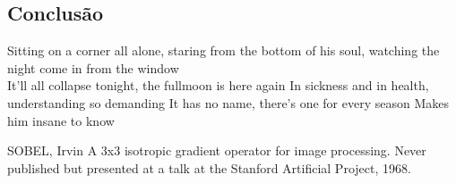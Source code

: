 \documentclass{sciposter}
\begin{document}
\begin{multicols}{3}
\section{Conclusão}

Sitting on a corner all alone,
staring from the bottom of his soul,
watching the night come in from the window
\\
It'll all collapse tonight, the fullmoon is here again
In sickness and in health, understanding so demanding
It has no name, there's one for every season
Makes him insane to know
\\
 



\begin{thebibliography}{1}





  
{SOBEL, Irvin}
\newblock A 3x3 isotropic gradient operator for image processing.
\newblock Never published but presented at a talk at the Stanford Artificial
  Project, 1968.
\end{thebibliography}

\end{multicols}
\end{document}
